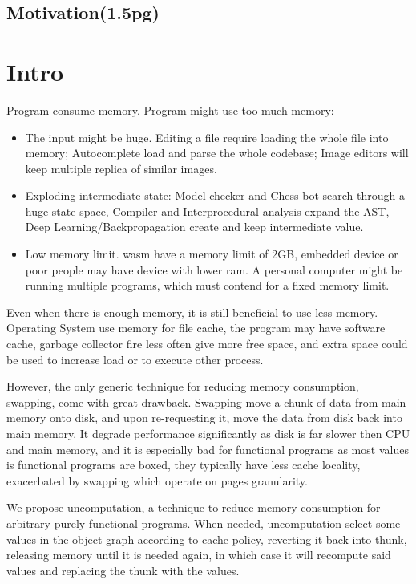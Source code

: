 \subsection{Motivation(1.5pg)}
\section{Intro}
Program consume memory. Program might use too much memory:
\begin{itemize}
	\item The input might be huge. Editing a file require loading the whole file into memory; Autocomplete load and parse the whole codebase; Image editors will keep multiple replica of similar images.
	\item Exploding intermediate state: Model checker and Chess bot search through a huge state space, Compiler and Interprocedural analysis expand the AST, Deep Learning/Backpropagation create and keep intermediate value.
	\item Low memory limit. wasm have a memory limit of 2GB, embedded device or poor people may have device with lower ram. A personal computer might be running multiple programs, which must contend for a fixed memory limit.
\end{itemize}

Even when there is enough memory, it is still beneficial to use less memory. Operating System use memory for file cache, the program may have software cache, garbage collector fire less often give more free space, and extra space could be used to increase load or to execute other process.


However, the only generic technique for reducing memory consumption, swapping, come with great drawback. Swapping move a chunk of data from main memory onto disk, and upon re-requesting it, move the data from disk back into main memory. It degrade performance significantly as disk is far slower then CPU and main memory, and it is especially bad for functional programs as most values is functional programs are boxed, they typically have less cache locality, exacerbated by swapping which operate on pages granularity.

We propose uncomputation, a technique to reduce memory consumption for arbitrary purely functional programs. When needed, uncomputation select some values in the object graph according to cache policy, reverting it back into thunk, releasing memory until it is needed again, in which case it will recompute said values and replacing the thunk with the values.

